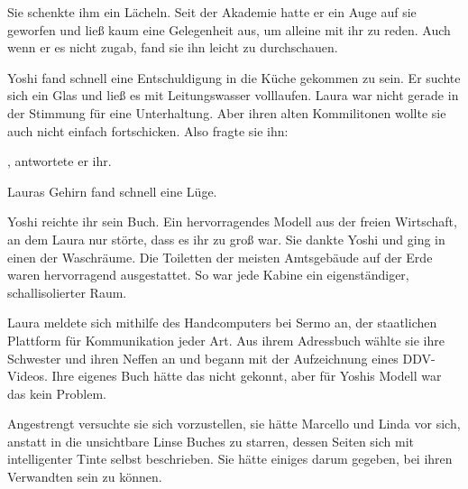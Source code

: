\par

Sie schenkte ihm ein Lächeln. Seit der Akademie hatte er ein Auge auf sie geworfen und ließ kaum eine Gelegenheit aus, um alleine mit ihr zu reden. Auch wenn er es nicht zugab, fand sie ihn leicht zu durchschauen. 

\par

Yoshi fand schnell eine Entschuldigung in die Küche gekommen zu sein. Er suchte sich ein Glas und ließ es mit Leitungswasser volllaufen. Laura war nicht gerade in der Stimmung für eine Unterhaltung. Aber ihren alten Kommilitonen wollte sie auch nicht einfach fortschicken. Also fragte sie ihn: 

\par

, antwortete er ihr. 

\par

Lauras Gehirn fand schnell eine Lüge. 

\par

Yoshi reichte ihr sein Buch. Ein hervorragendes Modell aus der freien Wirtschaft, an dem Laura nur störte, dass es ihr zu groß war. Sie dankte Yoshi und ging in einen der Waschräume. Die Toiletten der meisten Amtsgebäude auf der Erde waren hervorragend ausgestattet. So war jede Kabine ein eigenständiger, schallisolierter Raum.

\par

Laura meldete sich mithilfe des Handcomputers bei Sermo an, der staatlichen Plattform für Kommunikation jeder Art. Aus ihrem Adressbuch wählte sie ihre Schwester und ihren Neffen an und begann mit der Aufzeichnung eines DDV-Videos. Ihre eigenes Buch hätte das nicht gekonnt, aber für Yoshis Modell war das kein Problem.

\par

Angestrengt versuchte sie sich vorzustellen, sie hätte Marcello und Linda vor sich, anstatt in die unsichtbare Linse Buches zu starren, dessen Seiten sich mit intelligenter Tinte selbst beschrieben. Sie hätte einiges darum gegeben, bei ihren Verwandten sein zu können.

